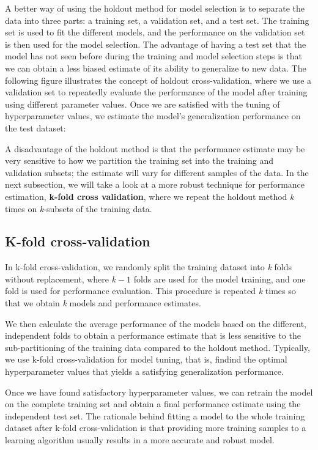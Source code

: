 \documentclass[11pt]{article}
\begin{document}
A better way of using the holdout method for model selection is to
separate the data into three parts: a training set, a validation set,
and a test set. The training set is used to fit the different models,
and the performance on the validation set is then used for the model
selection. The advantage of having a test set that the model has not
seen before during the training and model selection steps is that we can
obtain a less biased estimate of its ability to generalize to new data.
The following figure illustrates the concept of holdout
cross-validation, where we use a validation set to repeatedly evaluate
the performance of the model after training using different parameter
values. Once we are satisfied with the tuning of hyperparameter values,
we estimate the model's generalization performance on the test dataset:

A disadvantage of the holdout method is that the performance estimate
may be very sensitive to how we partition the training set into the
training and validation subsets; the estimate will vary for different
samples of the data. In the next subsection, we will take a look at a
more robust technique for performance estimation, \textbf{k-fold cross
validation}, where we repeat the holdout method \emph{k} times on
\emph{k}-subsets of the training data.

    \subsection{K-fold cross-validation}\label{k-fold-cross-validation}

    In k-fold cross-validation, we randomly split the training dataset into
\emph{k} folds without replacement, where \(k-1\) folds are used for the
model training, and one fold is used for performance evaluation. This
procedure is repeated \emph{k} times so that we obtain \emph{k} models
and performance estimates.

We then calculate the average performance of the models based on the
different, independent folds to obtain a performance estimate that is
less sensitive to the sub-partitioning of the training data compared to
the holdout method. Typically, we use k-fold cross-validation for model
tuning, that is, findind the optimal hyperparameter values that yields a
satisfying generalization performance.

Once we have found satisfactory hyperparameter values, we can retrain
the model on the complete training set and obtain a final performance
estimate using the independent test set. The rationale behind fitting a
model to the whole training dataset after k-fold cross-validation is
that providing more training samples to a learning algorithm usually
results in a more accurate and robust model.
\end{document}
